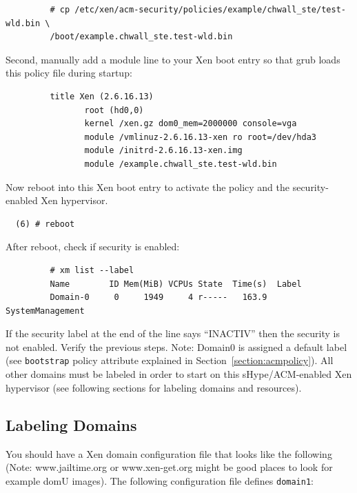 \documentclass[11pt,twoside,final,openright]{report}
\begin{document}
\begin{scriptsize}
\begin{verbatim}
         # cp /etc/xen/acm-security/policies/example/chwall_ste/test-wld.bin \
         /boot/example.chwall_ste.test-wld.bin
\end{verbatim}
\end{scriptsize}

Second, manually add a module line to your Xen boot entry so that grub
loads this policy file during startup:

\begin{scriptsize}
\begin{verbatim}
         title Xen (2.6.16.13)
                root (hd0,0)
                kernel /xen.gz dom0_mem=2000000 console=vga
                module /vmlinuz-2.6.16.13-xen ro root=/dev/hda3
                module /initrd-2.6.16.13-xen.img
                module /example.chwall_ste.test-wld.bin
\end{verbatim}
\end{scriptsize}

Now reboot into this Xen boot entry to activate the policy and the
security-enabled Xen hypervisor.

\begin{verbatim}
  (6) # reboot
\end{verbatim}

After reboot, check if security is enabled:

\begin{scriptsize}
\begin{verbatim}
         # xm list --label
         Name        ID Mem(MiB) VCPUs State  Time(s)  Label
         Domain-0     0     1949     4 r-----   163.9  SystemManagement
\end{verbatim}
\end{scriptsize}

If the security label at the end of the line says ``INACTIV'' then the
security is not enabled. Verify the previous steps. Note: Domain0 is
assigned a default label (see \verb|bootstrap| policy attribute
explained in Section~\ref{section:acmpolicy}). All other domains must
be labeled in order to start on this sHype/ACM-enabled Xen hypervisor
(see following sections for labeling domains and resources).

\subsection{Labeling Domains}
\label{subsection:acmexamplelabeldomains}
You should have a Xen domain configuration file that looks like the
following (Note: www.jailtime.org or www.xen-get.org might be good
places to look for example domU images). The following configuration
file defines \verb|domain1|:
\end{document}
